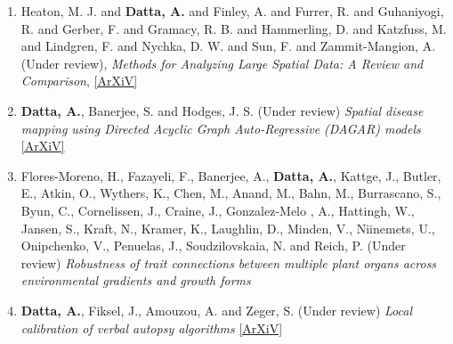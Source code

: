 \documentclass[11pt,a4paper,sans]{moderncv} %
\begin{document}
{\begin{enumerate}
\item \vskip 4mm Heaton, M. J. and \textbf{Datta, A.} and Finley, A. and Furrer, R. and Guhaniyogi, R. and Gerber, F. and Gramacy, R. B. and Hammerling, D. and Katzfuss, M. and Lindgren, F. and Nychka, D. W. and Sun, F. and Zammit-Mangion, A. (Under review), {\em Methods for Analyzing Large Spatial Data: A Review and Comparison}, \href{https://arxiv.org/pdf/1710.05013.pdf}{[ArXiV]}

\item \vskip 4mm \textbf{Datta, A.}, Banerjee, S. and Hodges, J. S. (Under review) {\em Spatial disease mapping using Directed Acyclic Graph Auto-Regressive (DAGAR) models} \href{https://arxiv.org/pdf/1704.07848.pdf}{[ArXiV]}

\item \vskip 2mm Flores-Moreno, H.,   Fazayeli, F.,   Banerjee, A.,   \textbf{Datta, A.},   Kattge, J.,   Butler, E.,   Atkin, O.,   Wythers, K.,   Chen, M.,   Anand, M.,   Bahn, M.,   Burrascano, S.,   Byun, C.,   Cornelissen, J.,   Craine, J.,   Gonzalez-Melo , A.,   Hattingh, W.,   Jansen, S.,   Kraft, N.,   Kramer, K.,   Laughlin, D.,   Minden, V.,  Niinemets, U.,   Onipchenko, V., Penuelas, J.,   Soudzilovskaia, N.   and   Reich, P. (Under review) {\em Robustness of trait connections between multiple plant organs across environmental gradients and growth forms}

\item \vskip 4mm \textbf{Datta, A.}, Fiksel, J., Amouzou, A. and Zeger, S. (Under review) {\em Local calibration of verbal autopsy algorithms} \href{https://arxiv.org/pdf/1810.10572.pdf}{[ArXiV]}

%
%
%
%
%


\end{enumerate}}
\end{document}

